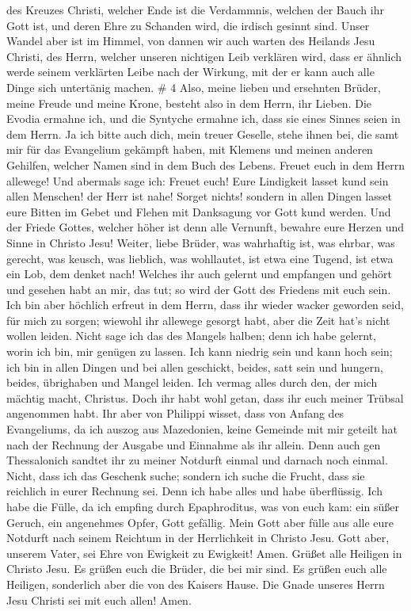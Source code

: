 des Kreuzes Christi,  welcher Ende ist die Verdammnis,
welchen der Bauch ihr Gott ist, und deren Ehre zu Schanden wird, die
irdisch gesinnt sind.  Unser Wandel aber ist im Himmel, von
dannen wir auch warten des Heilands Jesu Christi, des Herrn,
 welcher unseren nichtigen Leib verklären wird, dass er
ähnlich werde seinem verklärten Leibe nach der Wirkung, mit der er kann
auch alle Dinge sich untertänig machen. \# 4  Also, meine
lieben und ersehnten Brüder, meine Freude und meine Krone, besteht also
in dem Herrn, ihr Lieben.  Die Evodia ermahne ich, und die
Syntyche ermahne ich, dass sie eines Sinnes seien in dem Herrn.
 Ja ich bitte auch dich, mein treuer Geselle, stehe ihnen
bei, die samt mir für das Evangelium gekämpft haben, mit Klemens und
meinen anderen Gehilfen, welcher Namen sind in dem Buch des Lebens.
 Freuet euch in dem Herrn allewege! Und abermals sage ich:
Freuet euch!  Eure Lindigkeit lasset kund sein allen
Menschen! der Herr ist nahe!  Sorget nichts! sondern in
allen Dingen lasset eure Bitten im Gebet und Flehen mit Danksagung vor
Gott kund werden.  Und der Friede Gottes, welcher höher ist
denn alle Vernunft, bewahre eure Herzen und Sinne in Christo Jesu!
 Weiter, liebe Brüder, was wahrhaftig ist, was ehrbar, was
gerecht, was keusch, was lieblich, was wohllautet, ist etwa eine Tugend,
ist etwa ein Lob, dem denket nach!  Welches ihr auch gelernt
und empfangen und gehört und gesehen habt an mir, das tut; so wird der
Gott des Friedens mit euch sein.  Ich bin aber höchlich
erfreut in dem Herrn, dass ihr wieder wacker geworden seid, für mich zu
sorgen; wiewohl ihr allewege gesorgt habt, aber die Zeit hat's nicht
wollen leiden.  Nicht sage ich das des Mangels halben; denn
ich habe gelernt, worin ich bin, mir genügen zu lassen. 
Ich kann niedrig sein und kann hoch sein; ich bin in allen Dingen und
bei allen geschickt, beides, satt sein und hungern, beides, übrighaben
und Mangel leiden.  Ich vermag alles durch den, der mich
mächtig macht, Christus.  Doch ihr habt wohl getan, dass
ihr euch meiner Trübsal angenommen habt.  Ihr aber von
Philippi wisset, dass von Anfang des Evangeliums, da ich auszog aus
Mazedonien, keine Gemeinde mit mir geteilt hat nach der Rechnung der
Ausgabe und Einnahme als ihr allein.  Denn auch gen
Thessalonich sandtet ihr zu meiner Notdurft einmal und darnach noch
einmal.  Nicht, dass ich das Geschenk suche; sondern ich
suche die Frucht, dass sie reichlich in eurer Rechnung sei.
 Denn ich habe alles und habe überflüssig. Ich habe die
Fülle, da ich empfing durch Epaphroditus, was von euch kam: ein süßer
Geruch, ein angenehmes Opfer, Gott gefällig.  Mein Gott
aber fülle aus alle eure Notdurft nach seinem Reichtum in der
Herrlichkeit in Christo Jesu.  Gott aber, unserem Vater,
sei Ehre von Ewigkeit zu Ewigkeit! Amen.  Grüßet alle
Heiligen in Christo Jesu. Es grüßen euch die Brüder, die bei mir sind.
 Es grüßen euch alle Heiligen, sonderlich aber die von des
Kaisers Hause.  Die Gnade unseres Herrn Jesu Christi sei
mit euch allen! Amen.
